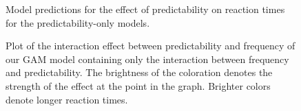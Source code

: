 \documentclass[
  12pt,
  letterpaper,
]{scrreprt}
\begin{document}
\begin{figure}[htbp]

\caption{\label{fig-PredicOnlyPlot}Model predictions for the effect of
predictability on reaction times for the predictability-only models.}


\end{figure}%

\begin{figure}[htbp]

\caption{\label{fig-gam2dplot1}Plot of the interaction effect between
predictability and frequency of our GAM model containing only the
interaction between frequency and predictability. The brightness of the
coloration denotes the strength of the effect at the point in the graph.
Brighter colors denote longer reaction times.}


\end{figure}%
\end{document}
